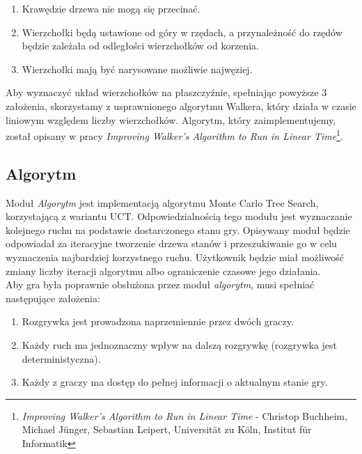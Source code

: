 \documentclass{article}
\newcommand{\modulename}[1]{\textit{#1}}
\begin{document}
	\begin{enumerate}
		\item Krawędzie drzewa nie mogą się przecinać.
		\item Wierzchołki będą ustawione od góry w rzędach, a przynależność do
		rzędów będzie zależała od odległości wierzchołków od korzenia.
		\item Wierzchołki mają być narysowane możliwie najwęziej.  \\
	\end{enumerate}

	\noindent Aby wyznaczyć układ wierzchołków na płaszczyźnie, spełniając powyższe 3 założenia, skorzystamy z usprawnionego algorytmu Walkera, który działa w czasie liniowym względem liczby wierzchołków. Algorytm, który zaimplementujemy, został opisany w pracy \textit{Improving Walker's Algorithm to Run in Linear Time}\footnote{\modulename{Improving Walker's Algorithm to Run in Linear Time} - Christop Buchheim, Michael Jünger, Sebastian Leipert, Universität zu Köln, Institut für Informatik}.
	
	\subsection{Algorytm}
	Moduł \modulename{Algorytm} jest implementacją algorytmu Monte Carlo Tree Search, korzystającą z wariantu UCT. Odpowiedzialnością tego modułu jest wyznaczanie kolejnego ruchu na podstawie dostarczonego stanu gry. Opisywany moduł będzie odpowiadał za iteracyjne tworzenie drzewa stanów i przeszukiwanie go w celu wyznaczenia najbardziej korzystnego ruchu. Użytkownik będzie miał możliwość zmiany liczby iteracji algorytmu albo ograniczenie czasowe jego działania. \\
	
	\noindent Aby gra była poprawnie obsłużona przez moduł \modulename{algorytm}, musi spełniać następujące założenia: \\
		
	\begin{enumerate}
		\item Rozgrywka jest prowadzona naprzemiennie przez dwóch graczy.
		\item Każdy ruch ma jednoznaczny wpływ na dalszą rozgrywkę (rozgrywka jest deterministyczna).
		\item Każdy z graczy ma dostęp do pełnej informacji o aktualnym stanie gry. \\
	\end{enumerate} 
	
\end{document}
